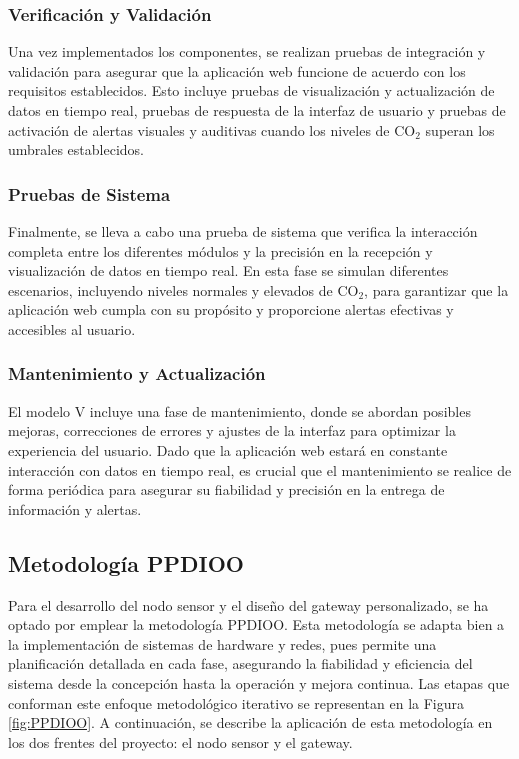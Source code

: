 \subsubsection{Verificación y Validación}

Una vez implementados los componentes, se realizan pruebas de integración y validación para asegurar que la aplicación web funcione de acuerdo con los requisitos establecidos. Esto incluye pruebas de visualización y actualización de datos en tiempo real, pruebas de respuesta de la interfaz de usuario y pruebas de activación de alertas visuales y auditivas cuando los niveles de CO\(_2\) superan los umbrales establecidos.

\subsubsection{Pruebas de Sistema}

Finalmente, se lleva a cabo una prueba de sistema que verifica la interacción completa entre los diferentes módulos y la precisión en la recepción y visualización de datos en tiempo real. En esta fase se simulan diferentes escenarios, incluyendo niveles normales y elevados de CO\(_2\), para garantizar que la aplicación web cumpla con su propósito y proporcione alertas efectivas y accesibles al usuario.

\subsubsection{Mantenimiento y Actualización}

El modelo V incluye una fase de mantenimiento, donde se abordan posibles mejoras, correcciones de errores y ajustes de la interfaz para optimizar la experiencia del usuario. Dado que la aplicación web estará en constante interacción con datos en tiempo real, es crucial que el mantenimiento se realice de forma periódica para asegurar su fiabilidad y precisión en la entrega de información y alertas.












\subsection{Metodología PPDIOO}

Para el desarrollo del nodo sensor y el diseño del gateway personalizado, se ha optado por emplear la metodología PPDIOO. Esta metodología se adapta bien a la implementación de sistemas de hardware y redes, pues permite una planificación detallada en cada fase, asegurando la fiabilidad y eficiencia del sistema desde la concepción hasta la operación y mejora continua. Las etapas que conforman este enfoque metodológico iterativo se representan en la Figura \ref{fig:PPDIOO}. A continuación, se describe la aplicación de esta metodología en los dos frentes del proyecto: el nodo sensor y el gateway.

